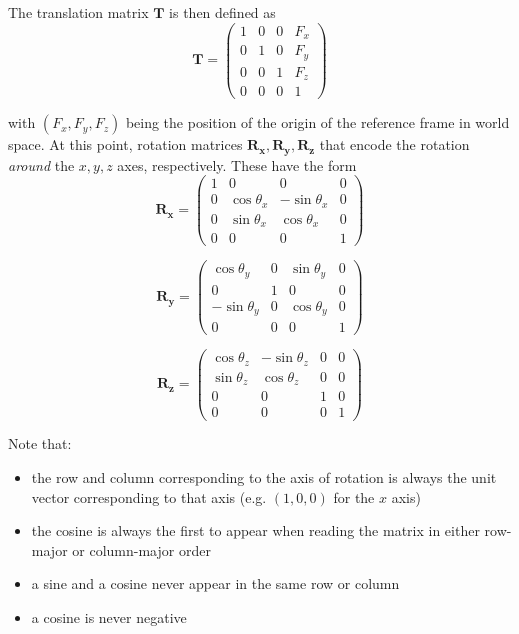 \documentclass[answers, a4paper, 11pt]{exam}
\begin{document}
\begin{questions}
\begin{parts}
\begin{solution}
			The translation matrix $\mathbf{T}$ is then defined as \begin{equation}
				\mathbf{T} = \begin{pmatrix}
					1 & 0 & 0 & F_x \\
					0 & 1 & 0 & F_y \\
					0 & 0 & 1 & F_z \\
					0 & 0 & 0 & 1
				\end{pmatrix}
			\end{equation}

			with $(F_x, F_y, F_z)$ being the position of the origin of the reference frame in world space.
			At this point, rotation matrices $\mathbf{R_x}, \mathbf{R_y}, \mathbf{R_z}$ that encode the rotation \emph{around} the $x, y, z$ axes, respectively.
			These have the form
			\begin{equation}
				\mathbf{R_x} = \begin{pmatrix}
					1 & 0 & 0 & 0 \\
					0 & \cos \theta_x & -\sin \theta_x & 0 \\
					0 & \sin \theta_x & \cos \theta_x & 0 \\
					0 & 0 & 0 & 1
				\end{pmatrix}
			\end{equation}

			\begin{equation}
				\mathbf{R_y} = \begin{pmatrix}
					\cos \theta_y & 0 & \sin \theta_y & 0 \\
					0 & 1 & 0 & 0 \\
					-\sin \theta_y & 0 & \cos \theta_y & 0 \\
					0 & 0 & 0 & 1
				\end{pmatrix}
			\end{equation}

			\begin{equation}
				\mathbf{R_z} = \begin{pmatrix}
					\cos \theta_z & -\sin \theta_z & 0 & 0 \\
					\sin\theta_z & \cos \theta_z & 0 & 0 \\
					0 & 0 & 1 & 0 \\
					0 & 0 & 0 & 1
				\end{pmatrix}
			\end{equation}

			Note that:

			\begin{itemize}
				\item the row and column corresponding to the axis of rotation is always the unit vector corresponding to that axis (e.g. $(1, 0, 0)$ for the $x$ axis)
				\item the cosine is always the first to appear when reading the matrix in either row-major or column-major order
				\item a sine and a cosine never appear in the same row or column
				\item a cosine is never negative
			\end{itemize}


\end{solution}
\end{parts}
\end{questions}
\end{document}
